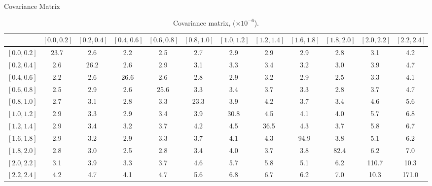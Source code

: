 \documentclass[t, 8pt]{beamer}
\begin{document}
\renewcommand\tabcolsep{0pt}
\renewcommand\arraystretch{1.6}
\begin{frame}{Covariance Matrix}
  \tiny{
  \begin{center}
    \begin{table}
    \begin{tabular}{l|ccccccccccc}
& \tiny{$\left[0.0,0.2\right]$}
& \tiny{$\left[0.2,0.4\right]$}
& \tiny{$\left[0.4,0.6\right]$} 
& \tiny{$\left[0.6,0.8\right]$}   
& \tiny{$\left[0.8,1.0\right]$}
& \tiny{$\left[1.0,1.2\right]$} 
& \tiny{$\left[1.2,1.4\right]$}
& \tiny{$\left[1.6,1.8\right]$}
& \tiny{$\left[1.8,2.0\right]$} 
& \tiny{$\left[2.0,2.2\right]$} 
& \tiny{$\left[2.2,2.4\right]$} \\ \hline
\tiny{$\left[0.0,0.2\right]$} & \alert{23.7} & 2.6 & 2.2 & 2.5 & 2.7 & 2.9 & 2.9 & 2.9 & 2.8 & 3.1 & 4.2 \\
\tiny{$\left[0.2,0.4\right]$} & 2.6 & \alert{26.2} & 2.6 & 2.9 & 3.1 & 3.3 & 3.4 & 3.2 & 3.0 & 3.9 & 4.7 \\
\tiny{$\left[0.4,0.6\right]$} & 2.2 & 2.6 & \alert{26.6} & 2.6 & 2.8 & 2.9 & 3.2 & 2.9 & 2.5 & 3.3 & 4.1 \\
\tiny{$\left[0.6,0.8\right]$} & 2.5 & 2.9 & 2.6 & \alert{25.6} & 3.3 & 3.4 & 3.7 & 3.3 & 2.8 & 3.7 & 4.7 \\
\tiny{$\left[0.8,1.0\right]$} & 2.7 & 3.1 & 2.8 & 3.3 & \alert{23.3} & 3.9 & 4.2 & 3.7 & 3.4 & 4.6 & 5.6 \\
\tiny{$\left[1.0,1.2\right]$} & 2.9 & 3.3 & 2.9 & 3.4 & 3.9 & \alert{30.8} & 4.5 & 4.1 & 4.0 & 5.7 & 6.8 \\
\tiny{$\left[1.2,1.4\right]$} & 2.9 & 3.4 & 3.2 & 3.7 & 4.2 & 4.5 & \alert{36.5} & 4.3 & 3.7 & 5.8 & 6.7 \\
\tiny{$\left[1.6,1.8\right]$} & 2.9 & 3.2 & 2.9 & 3.3 & 3.7 & 4.1 & 4.3 & \alert{94.9} & 3.8 & 5.1 & 6.2 \\
\tiny{$\left[1.8,2.0\right]$} & 2.8 & 3.0 & 2.5 & 2.8 & 3.4 & 4.0 & 3.7 & 3.8 & \alert{82.4} & 6.2 & 7.0 \\ 
\tiny{$\left[2.0,2.2\right]$} & 3.1 & 3.9 & 3.3 & 3.7 & 4.6 & 5.7 & 5.8 & 5.1 & 6.2 & \alert{110.7} & 10.3 \\
\tiny{$\left[2.2,2.4\right]$} & 4.2 & 4.7 & 4.1 & 4.7 & 5.6 & 6.8 & 6.7 & 6.2 & 7.0 & 10.3 & \alert{171.0} \\
    \end{tabular}
    \caption{Covariance matrix, ($\times 10^{-6}$).  }
    \end{table}
  \end{center}
  }
\end{frame}
\renewcommand\tabcolsep{6pt}
\renewcommand\arraystretch{1.}
\end{document}
